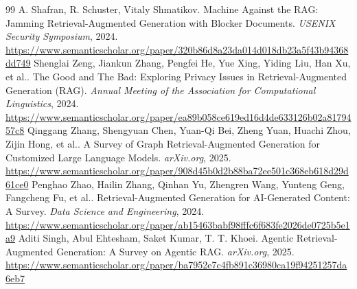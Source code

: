 \documentclass[11pt]{article}
\begin{document}
\begin{thebibliography}{99}
 A. Shafran, R. Schuster, Vitaly Shmatikov. Machine Against the RAG: Jamming Retrieval-Augmented Generation with Blocker Documents. \emph{USENIX Security Symposium}, 2024. \url{https://www.semanticscholar.org/paper/320b86d8a23da014d018db23a5f43b94368dd749}
 Shenglai Zeng, Jiankun Zhang, Pengfei He, Yue Xing, Yiding Liu, Han Xu, et al.. The Good and The Bad: Exploring Privacy Issues in Retrieval-Augmented Generation (RAG). \emph{Annual Meeting of the Association for Computational Linguistics}, 2024. \url{https://www.semanticscholar.org/paper/ea89b058ce619ed16d4de633126b02a8179457c8}
 Qinggang Zhang, Shengyuan Chen, Yuan-Qi Bei, Zheng Yuan, Huachi Zhou, Zijin Hong, et al.. A Survey of Graph Retrieval-Augmented Generation for Customized Large Language Models. \emph{arXiv.org}, 2025. \url{https://www.semanticscholar.org/paper/908d45b0d2b88ba72ee501c368eb618d29d61ce0}
 Penghao Zhao, Hailin Zhang, Qinhan Yu, Zhengren Wang, Yunteng Geng, Fangcheng Fu, et al.. Retrieval-Augmented Generation for AI-Generated Content: A Survey. \emph{Data Science and Engineering}, 2024. \url{https://www.semanticscholar.org/paper/ab15463babf98fffc6f683fe2026de0725b5e1a9}
 Aditi Singh, Abul Ehtesham, Saket Kumar, T. T. Khoei. Agentic Retrieval-Augmented Generation: A Survey on Agentic RAG. \emph{arXiv.org}, 2025. \url{https://www.semanticscholar.org/paper/ba7952e7c4fb891c36980ca19f94251257da6eb7}
\end{thebibliography}
\end{document}
